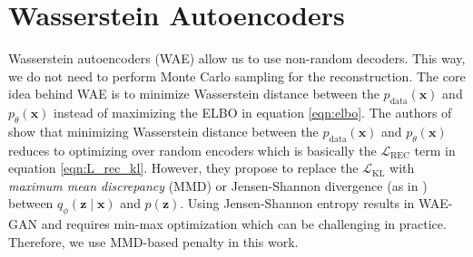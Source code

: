 \documentclass{article}
\def\bx{\mathbf{x}}
\def\bz{\mathbf{z}}
\theoremstyle{plain}
\theoremstyle{definition}
\begin{document}
\section{Wasserstein Autoencoders}
\label{sec:wasserstein_autoencoders}
Wasserstein autoencoders (WAE) \cite{tolstikhin2017wasserstein} allow us to use non-random decoders. This way, we do not need to perform Monte Carlo sampling for the reconstruction. The core idea behind WAE is to minimize Wasserstein distance between the $p_{\textrm{data}}(\bx)$ and $p_{\theta}(\bx)$ instead of maximizing the ELBO in equation \ref{eqn:elbo}. The authors of \citet{tolstikhin2017wasserstein}  show that minimizing Wasserstein distance between the $p_{\textrm{data}}(\bx)$ and $p_{\theta}(\bx)$  reduces to optimizing over random encoders which is basically the $\mathcal{L}_{\textrm{REC}}$ term in equation \ref{eqn:L_rec_kl}. However, they propose to replace the $\mathcal{L}_{\textrm{KL}}$ with \textit{maximum mean discrepancy} (MMD) or Jensen-Shannon divergence (as in \cite{goodfellow2014generative}) between $q_{\phi}(\bz \mid \bx)$ and $p(\bz)$. Using Jensen-Shannon entropy results in WAE-GAN and requires min-max optimization which can be challenging in practice. Therefore, we use MMD-based penalty in this work.
\end{document}
